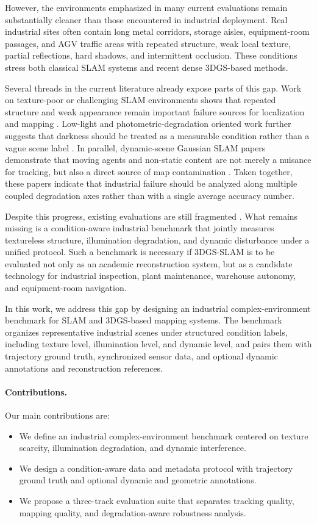 \documentclass[10pt,twocolumn]{article}
\begin{document}
However, the environments emphasized in many current evaluations remain substantially cleaner than those encountered in industrial deployment. Real industrial sites often contain long metal corridors, storage aisles, equipment-room passages, and AGV traffic areas with repeated structure, weak local texture, partial reflections, hard shadows, and intermittent occlusion. These conditions stress both classical SLAM systems and recent dense 3DGS-based methods.

Several threads in the current literature already expose parts of this gap. Work on texture-poor or challenging SLAM environments shows that repeated structure and weak appearance remain important failure sources for localization and mapping \cite{TexturelessORB2024}. Low-light and photometric-degradation oriented work further suggests that darkness should be treated as a measurable condition rather than a vague scene label \cite{LLGaussianMap2024}. In parallel, dynamic-scene Gaussian SLAM papers demonstrate that moving agents and non-static content are not merely a nuisance for tracking, but also a direct source of map contamination \cite{DynaGSLAM2024,WildGSSLAM2024}. Taken together, these papers indicate that industrial failure should be analyzed along multiple coupled degradation axes rather than with a single average accuracy number.

Despite this progress, existing evaluations are still fragmented \cite{LoopSplat2024,GSLoc2024}. What remains missing is a condition-aware industrial benchmark that jointly measures textureless structure, illumination degradation, and dynamic disturbance under a unified protocol. Such a benchmark is necessary if 3DGS-SLAM is to be evaluated not only as an academic reconstruction system, but as a candidate technology for industrial inspection, plant maintenance, warehouse autonomy, and equipment-room navigation.

In this work, we address this gap by designing an industrial complex-environment benchmark for SLAM and 3DGS-based mapping systems. The benchmark organizes representative industrial scenes under structured condition labels, including texture level, illumination level, and dynamic level, and pairs them with trajectory ground truth, synchronized sensor data, and optional dynamic annotations and reconstruction references.

\paragraph{Contributions.}
Our main contributions are:
\begin{itemize}[leftmargin=1.2em]
    \item We define an industrial complex-environment benchmark centered on texture scarcity, illumination degradation, and dynamic interference.
    \item We design a condition-aware data and metadata protocol with trajectory ground truth and optional dynamic and geometric annotations.
    \item We propose a three-track evaluation suite that separates tracking quality, mapping quality, and degradation-aware robustness analysis.
\end{itemize}
\end{document}
